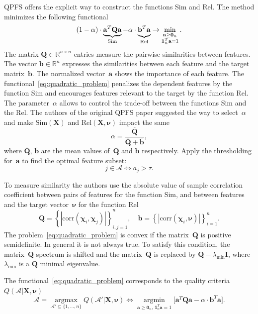 \documentclass[12pt,twoside]{article}
\newcommand{\ba}{\mathbf{a}}
\newcommand{\bb}{\mathbf{b}}
\newcommand{\bX}{\mathbf{X}}
\newcommand{\bQ}{\mathbf{Q}}
\newcommand{\bbR}{\mathbb{R}}
\newcommand{\cA}{\mathcal{A}}
\newcommand{\bchi}{\boldsymbol{\chi}}
\newcommand{\bnu}{\boldsymbol{\nu}}
\newcommand{\bOne}{\boldsymbol{1}}
\newcommand{\bZero}{\boldsymbol{0}}
\newcommand{\argmin}{\mathop{\arg \min}\limits}
\newcommand{\argmax}{\mathop{\arg \max}\limits}
\begin{document}
QPFS offers the explicit way to construct the functions Sim and Rel. 
The method minimizes the following functional
\begin{equation}
	(1 - \alpha) \cdot \underbrace{\ba^T \bQ \ba}_{\text{Sim}} - \alpha \cdot \underbrace{\vphantom{()} \mathbf{b}^T \ba}_{\text{Rel}} \rightarrow \min_{\substack{\ba \geq \bZero_n \\ \bOne_n^T \ba=1}}.
	\label{eq:quadratic_problem}
\end{equation}
The matrix $\bQ \in \bbR^{n \times n}$ entries measure the pairwise similarities between features. 
The vector $\mathbf{b} \in \bbR^n$ expresses the similarities between each feature and the target matrix~$\bb$.
The normalized vector~$\ba$ shows the importance of each feature. 
The functional~\eqref{eq:quadratic_problem} penalizes the dependent features by the function Sim and encourages features relevant to the target by the function Rel. 
The parameter~$\alpha$ allows to control the trade-off between the functions Sim and the Rel.
The authors of the original QPFS paper suggested the way to select~$\alpha$ and make $\text{Sim}(\bX)$ and $\text{Rel}(\bX, \bnu)$ impact the same
\begin{equation*}
	\alpha = \frac{\overline{\bQ}}{\overline{\bQ} + \overline{\bb}},
\end{equation*}
where $\overline{\bQ}$, $\overline{\bb}$ are the mean values of~$\bQ$ and $\bb$ respectively.
Apply the thresholding for~$\ba$ to find the optimal feature subset:
\[
	j \in \mathcal{A} \Leftrightarrow a_j > \tau.
\]

To measure similarity the authors use the absolute value of sample correlation coefficient between pairs of features for the function Sim, and between features and the target vector~$\bnu$ for the function Rel
\begin{equation}
	\bQ = \left\{\left|\text{corr}(\bchi_i, \bchi_j)\right|\right\}_{i,j=1}^n, \quad \bb = \left\{\left|\text{corr}(\bchi_i, \bnu)\right|\right\}_{i=1}^n.
	\label{eq:qpfs_1d_qb}
\end{equation}
The problem~\eqref{eq:quadratic_problem} is convex if the matrix~$\bQ$ is positive semidefinite. In general it is not always true. 
To satisfy this condition, the matrix~$\bQ$ spectrum is shifted and the matrix~$\bQ$ is replaced by $\bQ - \lambda_{\text{min}} \mathbf{I}$, where $\lambda_{\text{min}} $ is a $\bQ$ minimal eigenvalue.

The functional~\eqref{eq:quadratic_problem} corresponds to the quality criteria~$Q(\cA | \bX, \bnu)$
\begin{equation}
\cA = \argmax_{\cA' \subseteq \{1, \dots, n\}} Q(\cA' | \bX, \bnu) \Leftrightarrow \argmin_{\ba \geq \bZero_n, \, \bOne_n^T\ba=1} \bigl[\ba^T \bQ \ba - \alpha \cdot \mathbf{b}^T \ba \bigr].
\end{equation}
\end{document}
